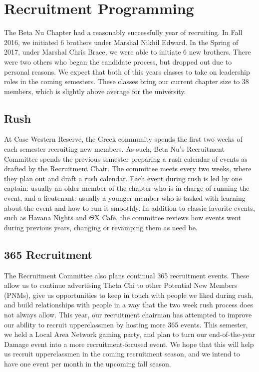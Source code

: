 \chapter{Recruitment Programming}

  The Beta Nu Chapter had a reasonably successfully year of recruiting. In Fall 2016, we initiated 6 brothers under Marshal Nikhil Edward. In the Spring of 2017, under Marshal Chris Brace, we were able to initiate 6 new brothers. There were two others who began the candidate process, but dropped out due to personal reasons. We expect that both of this years classes to take on leadership roles in the coming semesters. These classes bring our current chapter size to 38 members, which is slightly above average for the university.
    
  \section*{Rush}
    At Case Western Reserve, the Greek community spends the first two weeks of each semester recruiting new members. As such, Beta Nu’s Recruitment Committee spends the previous semester preparing a rush calendar of events as drafted by the Recruitment Chair. The committee meets every two weeks, where they plan out and draft a rush calendar. Each event during rush is led by one captain: usually an older member of the chapter who is in charge of running the event, and a lieutenant: usually a younger member who is tasked with learning about the event and how to run it smoothly. In addition to classic favorite events, such as Havana Nights and $\Theta$X Cafe, the committee reviews how events went during previous years, changing or revamping them as need be.

  \section*{365 Recruitment}    
    The Recruitment Committee also plans continual 365 recruitment events. These allow us to continue advertising Theta Chi to other Potential New Members (PNMs), give us opportunities to keep in touch with people we liked during rush, and build relationships with people in a way that the two week rush process does not always allow. This year, our recruitment chairman has attempted to improve our ability to recruit upperclassmen by hosting more 365 events. This semester, we held a Local Area Network gaming party, and plan to turn our end-of-the-year Damage event into a more recruitment-focused event. We hope that this will help us recruit upperclassmen in the coming recruitment season, and we intend to have one event per month in the upcoming fall season.
    
